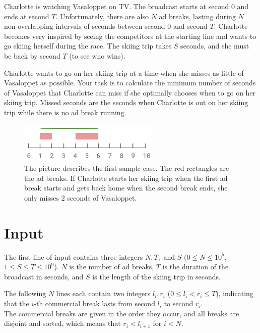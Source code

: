 \noindent
Charlotte is watching Vasaloppet on TV. The broadcast starts at second $0$ and ends at second $T$.
Unfortunately, there are also $N$ ad breaks, lasting during $N$ non-overlapping intervals of seconds
between second $0$ and second $T$. Charlotte becomes very inspired by seeing the competitors at the starting
line and wants to go skiing herself during the race. The skiing trip takes $S$ seconds, and she must be back by
second $T$ (to see who wins).

Charlotte wants to go on her skiing trip at a time when she misses as little of Vasaloppet as possible.
Your task is to calculate the minimum number of seconds of Vasaloppet that Charlotte can miss if she optimally
chooses when to go on her skiing trip. Missed seconds are the seconds when Charlotte is out on her skiing trip
while there is no ad break running.

\begin{centering}
  \begin{figure}[h]
      \centering
      \includegraphics[width=0.6\textwidth]{sample1.PNG}
      \caption{The picture describes the first sample case. The red rectangles are the ad breaks. If Charlotte
      starts her skiing trip when the first ad break starts and gets back home when the second break ends, she only misses
      $2$ seconds of Vasaloppet.}
      \label{fig:enter-label}
  \end{figure}
\end{centering}

\section*{Input}
The first line of input contains three integers $N, T,$ and $S$ ($0 \leq N \leq 10^5$, $1 \leq S \leq T \leq 10^9$). 
$N$ is the number of ad breaks, $T$ is the duration of the broadcast in seconds, and $S$ is the length of the skiing trip in seconds.

The following $N$ lines each contain two integers $l_i, r_i$ ($0 \leq l_i < r_i \leq T$),
indicating that the $i$-th commercial break lasts from second $l_i$ to second $r_i$.\\
The commercial breaks are given in the order they occur, and all breaks are disjoint and sorted, 
which means that $r_i < l_{i+1}$ for $i < N$.

